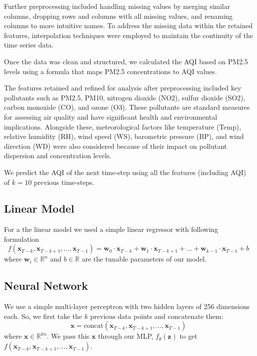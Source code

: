 \documentclass[12pt,a4paper]{article}
\begin{document}
Further preprocessing included handling missing values by merging similar columns, dropping rows and columns with all missing values, and renaming columns to more intuitive names. To address the missing data within the retained features, interpolation techniques were employed to maintain the continuity of the time series data.

Once the data was clean and structured, we calculated the AQI based on PM2.5 levels using a formula that maps PM2.5 concentrations to AQI values.

The features retained and refined for analysis after preprocessing included key pollutants such as PM2.5, PM10, nitrogen dioxide (NO2), sulfur dioxide (SO2), carbon monoxide (CO), and ozone (O3). These pollutants are standard measures for assessing air quality and have significant health and environmental implications. Alongside these, meteorological factors like temperature (Temp), relative humidity (RH), wind speed (WS), barometric pressure (BP), and wind direction (WD) were also considered because of their impact on pollutant dispersion and concentration levels. 

We predict the AQI of the next time-step using all the features (including AQI) of $k=10$ previous time-steps.

\subsection{Linear Model}
For a the linear model we used a simple linear regressor with following formulation
\begin{equation}
  f(\mathbf{x}_{T-k},\mathbf{x}_{T-k+1},...,\mathbf{x}_{T-1}) = \mathbf{w}_{0}\cdot\mathbf{x}_{T-k}+\mathbf{w}_{1}\cdot\mathbf{x}_{T-k+1} + ... + \mathbf{w}_{k-1}\cdot\mathbf{x}_{T-1} + b
\end{equation}
where $\mathbf{w}_{i} \in \mathbb{R}^n$ and $b\in \mathbb{R}$  are the tunable parameters of our model.
\subsection{Neural Network}
We use a simple multi-layer perceptron with two hidden layers of 256 dimensions each. So, we first take the $k$ previous data points and concatenate them:
\begin{equation}
  \label{concat}
  \mathbf{x}= \text{concat}(\mathbf{x}_{T-k},\mathbf{x}_{T-k+1},...,\mathbf{x}_{T-1})
\end{equation}
where $\mathbf{x}\in \mathbb{R}^{kn}$. We pass this $\mathbf{x}$ through our MLP, $f_\theta(\mathbf{z})$ to get $f(\mathbf{x}_{T-k},\mathbf{x}_{T-k+1},...,\mathbf{x}_{T-1})$.
\end{document}
